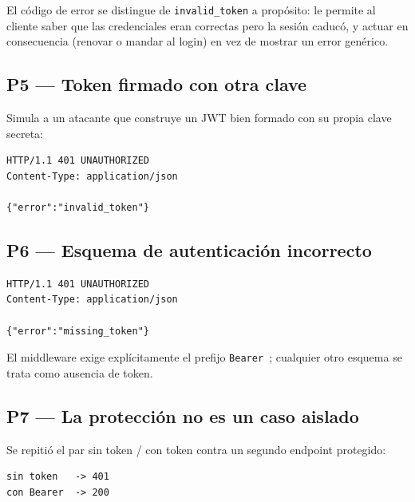 \documentclass[11pt,letterpaper]{article}
\begin{document}
\noindent El código de error se distingue de \texttt{invalid\_token} a propósito: le permite
al cliente saber que las credenciales eran correctas pero la sesión caducó, y actuar en
consecuencia (renovar o mandar al login) en vez de mostrar un error genérico.

\subsection{P5 — Token firmado con otra clave}

Simula a un atacante que construye un JWT bien formado con su propia clave secreta:

\begin{consola}[title={\$ curl -i /api/v1/auth/me -H "Authorization: Bearer <firmado por un tercero>"}]
\begin{lstlisting}[style=terminal]
HTTP/1.1 401 UNAUTHORIZED
Content-Type: application/json

{"error":"invalid_token"}
\end{lstlisting}
\end{consola}

\subsection{P6 — Esquema de autenticación incorrecto}

\begin{consola}[title={\$ curl -i /api/v1/auth/me -H "Authorization: Basic <CREDENCIAL-REDACTADA>"}]
\begin{lstlisting}[style=terminal]
HTTP/1.1 401 UNAUTHORIZED
Content-Type: application/json

{"error":"missing_token"}
\end{lstlisting}
\end{consola}

\noindent El middleware exige explícitamente el prefijo \texttt{Bearer }; cualquier otro
esquema se trata como ausencia de token.

\subsection{P7 — La protección no es un caso aislado}

Se repitió el par sin token / con token contra un segundo endpoint protegido:

\begin{consola}[title={\$ curl -o /dev/null -w "\%\{http\_code\}" /api/v1/dashboard}]
\begin{lstlisting}[style=terminal]
sin token   -> 401
con Bearer  -> 200
\end{lstlisting}
\end{consola}
\end{document}
